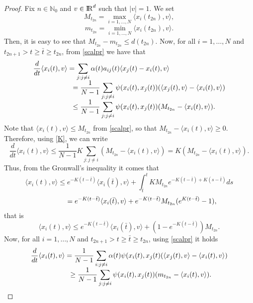 \documentclass[a4paper,11pt,oneside]{article}
\newcommand{\RR}{{{\rm I} \kern -.15em {\rm R} }}
\begin{document}
	\begin{proof}
		Fix $n\in\mathbb{N}_{0}$ and $v\in\RR^{d}$ such that $\lvert v\rvert=1$. We set $$M_{t_{2n}}=\max_{i=1,\dots,N}\langle x_{i}(t_{2n}),v\rangle,$$$$m_{t_{2n}}=\min_{i=1,\dots,N}\langle x_{i}(t_{2n}),v\rangle.$$
		Then, it is easy to see that $M_{t_{2n}}-m_{t_{2n}}\leq d(t_{2n})$. Now, for all $i=1,\dots,N$ and $t_{2n+1}>t\geq \bar{t}\geq t_{2n}$, from \eqref{scalpr} we have that 
		$$
		\begin{array}{l}
			\displaystyle{
				\frac{d}{dt}\langle x_{i}(t),v\rangle=\sum_{j:j\neq i}\alpha(t)a_{ij}(t)\langle x_{j}(t)-x_{i}(t),v\rangle}\\
			\displaystyle{\hspace{2 cm}=\frac{1}{N-1}\sum_{j:j\neq i}\psi( x_{i}(t), x_{j}(t))(\langle x_{j}(t),v\rangle-\langle x_{i}(t),v\rangle)}\\
			\displaystyle{\hspace{2 cm}\leq \frac{1}{N-1}\sum_{j:j\neq i}\psi(x_{i}(t), x_{j}(t))(M_{t_{2n}}-\langle x_{i}(t),v\rangle).}
		\end{array}
		$$
		Note that $\langle x_{i}(t),v\rangle\leq M_{t_{2n}}$ from \eqref{scalpr}, so that $M_{t_{2n}}-\langle x_{i}(t),v\rangle\geq 0$. Therefore, using \eqref{K}, we can write $$\frac{d}{dt}\langle x_{i}(t),v\rangle\leq\frac{1}{N-1}K\sum_{j:j\neq i}(M_{t_{2n}}-\langle x_{i}(t),v\rangle)=K(M_{t_{2n}}-\langle x_{i}(t),v\rangle).$$
		Thus, from the Gronwall's inequality it comes that $$\langle x_{i}(t),v\rangle\leq e^{-K(t-\bar{t})}\langle x_{i}(\bar{t}),v\rangle+\int_{\bar{t}}^{t}KM_{t_{2n}}e^{-K(t-\bar{t})+K(s-\bar{t})}ds$$
		$$\hspace{1.3cm}=e^{-K(t-\bar{t})}\langle x_{i}(\bar{t}),v\rangle+e^{-K(t-\bar{t})}M_{t_{2n}}(e^{K(t-\bar{t})}-1),$$
		that is \begin{equation}\label{2}
			\langle x_{i}(t),v\rangle\leq e^{-K(t-\bar{t})}\langle x_{i}(\bar{t}),v\rangle+(1-e^{-K(t-\bar{t})})M_{t_{2n}}.
		\end{equation}
		Now, for all $i=1,\dots,N$ and $t_{2n+1}>t\geq \bar{t}\geq t_{2n}$, using \eqref{scalpr} it holds
		$$
		\begin{array}{l}
			\displaystyle{
				\frac{d}{dt}\langle x_{i}(t),v\rangle=\frac{1}{N-1}\sum_{i:j\neq i}\alpha(t)\psi(x_{i}(t),x_{j}(t)(\langle x_{j}(t),v\rangle-\langle x_{i}(t),v\rangle)}\\
			\displaystyle{
				\hspace{2 cm}\geq \frac{1}{N-1}\sum_{j:j\neq i}\psi(x_{i}(t),x_{j}(t))(m_{t_{2n}}-\langle x_{i}(t),v\rangle).}

\end{array}$$
\end{proof}
\end{document}

